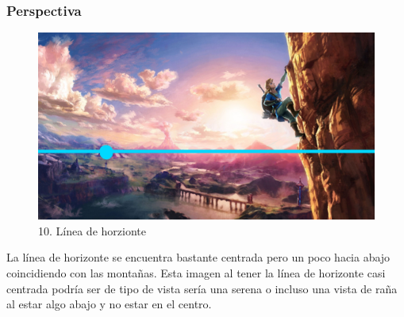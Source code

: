 \documentclass[12pt]{article}
\begin{document}
        \subsubsection{Perspectiva}
        \begin{figure}[H]
          \centering
          \includegraphics[scale=0.35]{images/Selena/10 linia de horizonte.jpg}
          \caption{\small 10. Línea de horzionte}
        \end{figure}
        La línea de horizonte se encuentra bastante centrada pero un poco hacia abajo coincidiendo con las montañas. Esta imagen al tener la línea de horizonte casi centrada podría ser de tipo de vista sería una serena o incluso una vista de raña al estar algo abajo y no estar en el centro. 

        
\end{document}
